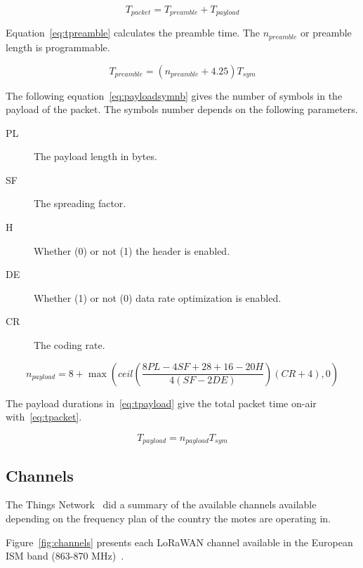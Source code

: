 \begin{equation}
  \label{eq:tpacket}
  T_{packet} = T_{preamble} + T_{payload}
\end{equation}

Equation~\ref{eq:tpreamble} calculates the preamble time. The $n_{preamble}$
or preamble length is programmable.

\begin{equation}
  \label{eq:tpreamble}
  T_{preamble} = (n_{preamble} + 4.25)T_{sym}
\end{equation}

The following equation~\ref{eq:payloadsymnb} gives the number of symbols in the
payload of the packet.
The symbols number depends on the following parameters.

\begin{description}
  \item[PL] The payload length in bytes.
  \item[SF] The spreading factor.
  \item[H] Whether (0) or not (1) the header is enabled.
  \item[DE] Whether (1) or not (0) data rate optimization is enabled.
  \item[CR] The coding rate.
\end{description}

\begin{equation}
  \label{eq:payloadsymnb}
  n_{payload} = 8 + \max(ceil(\frac{8PL - 4SF + 28 + 16 - 20H}{4(SF - 2DE)})(CR + 4),0)
\end{equation}

The payload durations in~\ref{eq:tpayload} give the total packet time on-air
with~\ref{eq:tpacket}.

\begin{equation}
  \label{eq:tpayload}
  T_{payload} = n_{payload} T_{sym}
\end{equation}


\subsection{Channels}

The Things Network~\cite{ttnfrequencyplans} did a summary of the available
channels available depending on the frequency plan of the country the motes are
operating in.

Figure~\ref{fig:channels} presents each LoRaWAN channel available in the
European ISM band (863-870 MHz)~\cite{Polonelli_2019}.

